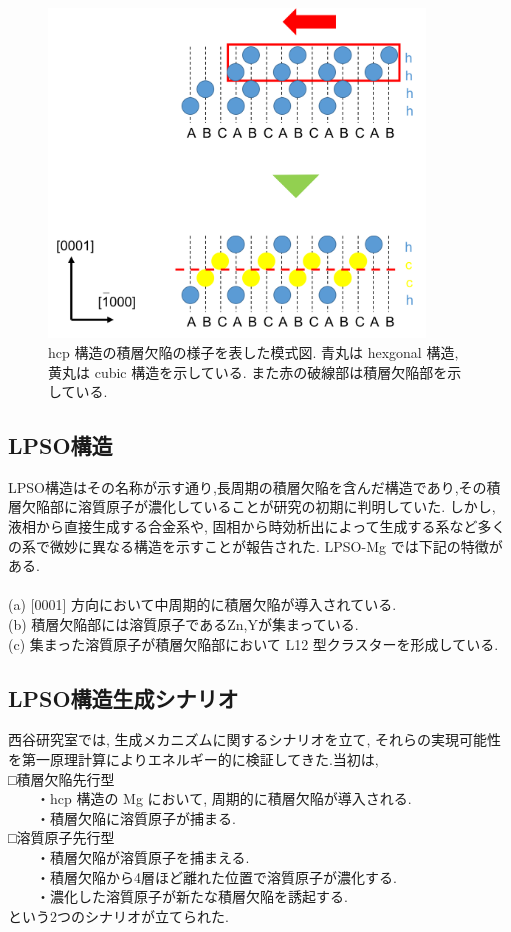 \begin{figure}[htbp]
	\begin{center}
		\includegraphics[width=100mm]{../intro/stuc.png}
		\caption{hcp 構造の積層欠陥の様子を表した模式図. 青丸は hexgonal 構造, 黄丸は cubic 構造を示している. また赤の破線部は積層欠陥部を示している.}
		\label{default}
	\end{center}
\end{figure}

\subsection{LPSO構造}
LPSO構造はその名称が示す通り,長周期の積層欠陥を含んだ構造であり,その積層欠陥部に溶質原子が濃化していることが研究の初期に判明していた. しかし, 液相から直接生成する合金系や, 固相から時効析出によって生成する系など多くの系で微妙に異なる構造を示すことが報告された. LPSO-Mg では下記の特徴がある.\\
\\(a) [0001] 方向において中周期的に積層欠陥が導入されている.\\
(b) 積層欠陥部には溶質原子であるZn,Yが集まっている.\\
(c) 集まった溶質原子が積層欠陥部において L12 型クラスターを形成している.

\subsection{LPSO構造生成シナリオ}
西谷研究室では, 生成メカニズムに関するシナリオを立て, それらの実現可能性を第一原理計算によりエネルギー的に検証してきた.当初は,
\\□積層欠陥先行型
\\　　・hcp 構造の Mg において, 周期的に積層欠陥が導入される.
\\　　・積層欠陥に溶質原子が捕まる.
\\□溶質原子先行型
\\　　・積層欠陥が溶質原子を捕まえる.
\\　　・積層欠陥から4層ほど離れた位置で溶質原子が濃化する.
\\　　・濃化した溶質原子が新たな積層欠陥を誘起する.\\
という2つのシナリオが立てられた.\\


